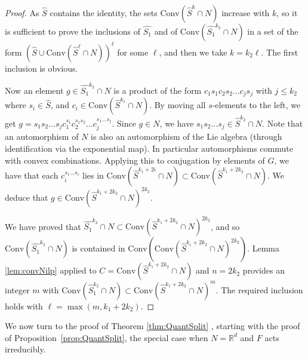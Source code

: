 \documentclass[11pt,leqno]{article}
\theoremstyle{plain}
\theoremstyle{definition}
\theoremstyle{remark}
\numberwithin{equation}{section}
\newcommand{\R}{\mathbb{R}}
\begin{document}
\begin{proof} As $\widehat{S}$ contains the identity, the sets $ \mathrm{Conv}(\widehat{S}^{k}\cap N)$ increase with $k$, so it is sufficient to prove the inclusions of $\widehat{S_1}$ and of $\mathrm{Conv}(\widehat{S_1}^{k_2}\cap N)$ in a set of the form $\left( \widehat{S}\cup \mathrm{Conv}(\widehat{S}^{\ell}\cap N)\right)^{\ell}$ for some $\ell$, and then we take $k=k_2\ell$. The first inclusion is obvious.

Now an element $g\in \widehat{S_1}^{k_2}\cap N$ is a product of the form $c_1s_1c_2s_2\ldots c_{j}s_j$ with $j\leq k_2$
where $s_i\in \widehat{S}$, and $c_i\in \text{Conv}(\widehat{S}^{k_1}\cap N)$. By moving all $s$-elements to the left, we get $g=s_1s_2\ldots s_j c_1^{s_1}c_2^{s_1s_2}\ldots c_j^{s_1\ldots s_j}$. Since $g\in N$, we have $s_1s_2\ldots s_j \in \widehat{S}^{k_2}\cap N$. 
Note that an automorphism of $N$ is also an automorphism of the Lie algebra (through identification via the exponential map). In particular automorphisms commute with convex combinations. Applying this to conjugation by elements of $G$, we have that each $c_i^{s_1\ldots s_i}$ lies in $\mathrm{Conv}(\widehat{S}^{k_1+2i}\cap N)\subset \mathrm{Conv}(\widehat{S}^{k_1+2k_2}\cap N)$. We deduce that $g\in  \mathrm{Conv}(\widehat{S}^{k_1+2k_2}\cap N)^{2k_2}$. 

We have proved that
$\widehat{S_1}^{k_2}\cap N\subset  \mathrm{Conv}(\widehat{S}^{k_1+2k_2}\cap N)^{2k_2}$, and so $\mathrm{Conv}(\widehat{S_1}^{k_2}\cap N)$ is contained in  $\mathrm{Conv}\left(\mathrm{Conv}(\widehat{S}^{k_1+2k_2}\cap N)^{2k_2}\right)$. 
Lemma \ref{lem:convNilp} applied to $C=\mathrm{Conv}(\widehat{S}^{k_1+2k_2}\cap N)$ and $n=2k_2$ provides an integer $m$ with $\mathrm{Conv}(\widehat{S}_1^{k_2}\cap N)\subset \mathrm{Conv}(\widehat{S}^{k_1+2k_2}\cap N)^m$. The required inclusion holds with $\ell=\max(m,k_1+2k_2)$.
\end{proof}
 



We now turn to the proof of Theorem \ref{thm:QuantSplit} , starting with the proof of Proposition~\ref{prop:QuantSplit}, the special case  when $N=\R^d$ and $F$ acts irreducibly.
\end{document}
